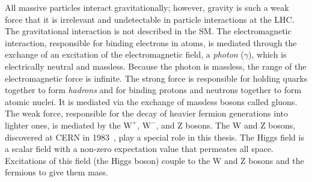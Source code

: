 All massive particles interact gravitationally; however, gravity is such a weak
force that it is irrelevant and undetectable in particle interactions at the
LHC. The gravitational interaction is not described in the SM. The
electromagnetic interaction, responsible for binding electrons in atoms, is
mediated through the exchange of an excitation of the electromagnetic field, a
\textit{photon} ($\gamma$), which is electrically neutral and massless. Because
the photon is massless, the range of the electromagnetic force is infinite. The
strong force is responsible for holding quarks together to form \textit{hadrons}
and for binding protons and neutrons together to form atomic nuclei. It is
mediated via the exchange of massless bosons called gluons. The weak force,
responsible for the decay of heavier fermion generations into lighter ones, is
mediated by the $\text{W}^+$, $\text{W}^-$, and Z bosons. The W and Z bosons,
discovered at CERN in 1983~\cite{ARNISON1983103,BANNER1983476}, play a special
role in this thesis. The Higgs field is a scalar field with a non-zero
expectation value that permeates all space. Excitations of this field (the Higgs
boson) couple to the W and Z bosons and the fermions to give them mass.

\begin{table}[tb]
  
\end{table}

